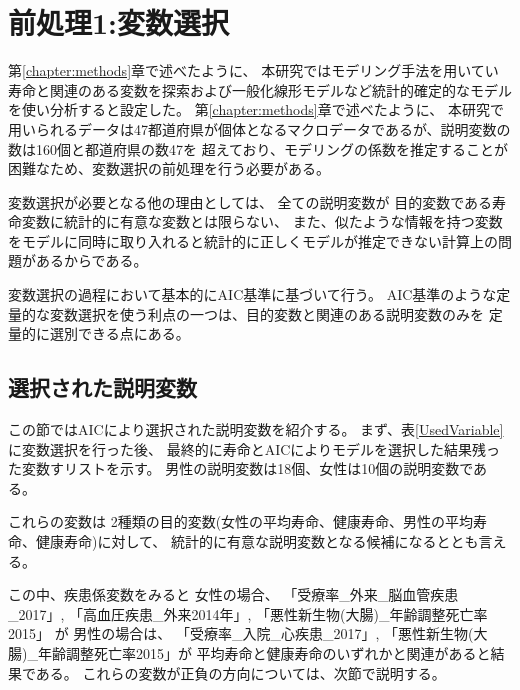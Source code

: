 \documentclass[a4j,11pt,mc]{jreport}
\newcommand{\tb}[1]{\textcolor{blue}{#1}} %
\begin{document}
\chapter{前処理1:変数選択}\label{chapter:VarSelection}

第\ref{chapter:methods}章で述べたように、
本研究ではモデリング手法を用いてい
寿命と関連のある変数を探索および一般化線形モデルなど統計的確定的なモデルを使い分析すると設定した。
第\ref{chapter:methods}章で述べたように、
本研究で用いられるデータは47都道府県が個体となるマクロデータであるが、説明変数の数は160個と都道府県の数47を
超えており、モデリングの係数を推定することが困難なため、変数選択の前処理を行う必要がある。

変数選択が必要となる他の理由としては、
全ての説明変数が
目的変数である寿命変数に統計的に有意な変数とは限らない、
また、似たような情報を持つ変数をモデルに同時に取り入れると統計的に正しくモデルが推定できない計算上の問題があるからである。

変数選択の過程において基本的にAIC基準に基づいて行う。
AIC基準のような定量的な変数選択を使う利点の一つは、目的変数と関連のある説明変数のみを
定量的に選別できる点にある。


%
%
%


\section{選択された説明変数}

この節ではAICにより選択された説明変数を紹介する。
まず、表\ref{UsedVariable}に変数選択を行った後、
最終的に寿命とAICによりモデルを選択した結果残った変数すリストを示す。
男性の説明変数は18個、女性は10個の説明変数である。


これらの変数は
2種類の目的変数(女性の平均寿命、健康寿命、男性の平均寿命、健康寿命)に対して、
統計的に有意な説明変数となる候補になるととも言える。



この中、疾患係変数をみると
女性の場合、
「受療率\_外来\_脳血管疾患\_2017」,
「高血圧疾患\_外来2014年」,
「悪性新生物(大腸)\_年齢調整死亡率2015」
が
男性の場合は、
「受療率\_入院\_心疾患\_2017」,
「悪性新生物(大腸)\_年齢調整死亡率2015」が
平均寿命と健康寿命のいずれかと関連があると結果である。
これらの変数が正負の方向については、次節で説明する。
\end{document}

